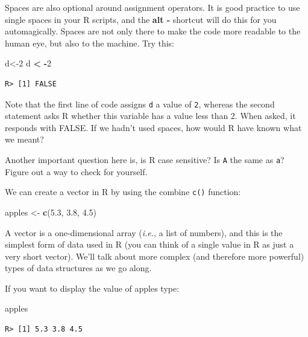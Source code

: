 \documentclass[]{book}
\newenvironment{Shaded}{\begin{snugshade}}{\end{snugshade}}
\newcommand{\KeywordTok}[1]{\textcolor[rgb]{0.13,0.29,0.53}{\textbf{#1}}}
\newcommand{\DecValTok}[1]{\textcolor[rgb]{0.00,0.00,0.81}{#1}}
\newcommand{\FloatTok}[1]{\textcolor[rgb]{0.00,0.00,0.81}{#1}}
\newcommand{\StringTok}[1]{\textcolor[rgb]{0.31,0.60,0.02}{#1}}
\newcommand{\OperatorTok}[1]{\textcolor[rgb]{0.81,0.36,0.00}{\textbf{#1}}}
\newcommand{\NormalTok}[1]{#1}
\theoremstyle{definition}
\theoremstyle{definition}
\theoremstyle{definition}
\theoremstyle{remark}
\begin{document}
Spaces are also optional around assignment operators. It is good
practice to use single spaces in your R scripts, and the \textbf{alt -}
shortcut will do this for you automagically. Spaces are not only there
to make the code more readable to the human eye, but also to the
machine. Try this:

\begin{Shaded}
\begin{Highlighting}[]
\NormalTok{d<-}\DecValTok{2}
\NormalTok{d }\OperatorTok{<}\StringTok{ }\OperatorTok{-}\DecValTok{2}
\end{Highlighting}
\end{Shaded}

\begin{verbatim}
R> [1] FALSE
\end{verbatim}

Note that the first line of code assigns \texttt{d} a value of
\texttt{2}, whereas the second statement asks R whether this variable
has a value less than 2. When asked, it responds with FALSE. If we
hadn't used spaces, how would R have known what we meant?

Another important question here is, is R case sensitive? Is \texttt{A}
the same as \texttt{a}? Figure out a way to check for yourself.

We can create a vector in R by using the combine \texttt{c()} function:

\begin{Shaded}
\begin{Highlighting}[]
\NormalTok{apples <-}\StringTok{ }\KeywordTok{c}\NormalTok{(}\FloatTok{5.3}\NormalTok{, }\FloatTok{3.8}\NormalTok{, }\FloatTok{4.5}\NormalTok{)}
\end{Highlighting}
\end{Shaded}

A vector is a one-dimensional array (\emph{i.e.}, a list of numbers),
and this is the simplest form of data used in R (you can think of a
single value in R as just a very short vector). We'll talk about more
complex (and therefore more powerful) types of data structures as we go
along.

If you want to display the value of apples type:

\begin{Shaded}
\begin{Highlighting}[]
\NormalTok{apples}
\end{Highlighting}
\end{Shaded}

\begin{verbatim}
R> [1] 5.3 3.8 4.5
\end{verbatim}
\end{document}
